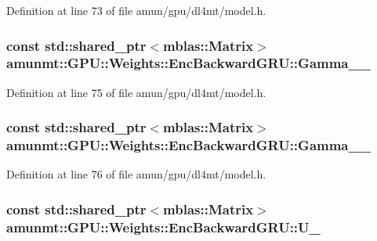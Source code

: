 Definition at line 73 of file amun/gpu/dl4mt/model.\+h.

\subsubsection[{\texorpdfstring{Gamma\+\_\+1\+\_\+}{Gamma_1_}}]{\setlength{\rightskip}{0pt plus 5cm}const std\+::shared\+\_\+ptr$<${\bf mblas\+::\+Matrix}$>$ amunmt\+::\+G\+P\+U\+::\+Weights\+::\+Enc\+Backward\+G\+R\+U\+::\+Gamma\+\_\+\_\+}\hypertarget{structamunmt_1_1GPU_1_1Weights_1_1EncBackwardGRU_a2c10a7a39209e10da9d93f915e5b890e}{}\label{structamunmt_1_1GPU_1_1Weights_1_1EncBackwardGRU_a2c10a7a39209e10da9d93f915e5b890e}


Definition at line 75 of file amun/gpu/dl4mt/model.\+h.

\subsubsection[{\texorpdfstring{Gamma\+\_\+2\+\_\+}{Gamma_2_}}]{\setlength{\rightskip}{0pt plus 5cm}const std\+::shared\+\_\+ptr$<${\bf mblas\+::\+Matrix}$>$ amunmt\+::\+G\+P\+U\+::\+Weights\+::\+Enc\+Backward\+G\+R\+U\+::\+Gamma\+\_\+\_\+}\hypertarget{structamunmt_1_1GPU_1_1Weights_1_1EncBackwardGRU_acbbe979c9f3efb14be4e607a3a8519dc}{}\label{structamunmt_1_1GPU_1_1Weights_1_1EncBackwardGRU_acbbe979c9f3efb14be4e607a3a8519dc}


Definition at line 76 of file amun/gpu/dl4mt/model.\+h.

\subsubsection[{\texorpdfstring{U\+\_\+}{U_}}]{\setlength{\rightskip}{0pt plus 5cm}const std\+::shared\+\_\+ptr$<${\bf mblas\+::\+Matrix}$>$ amunmt\+::\+G\+P\+U\+::\+Weights\+::\+Enc\+Backward\+G\+R\+U\+::\+U\+\_\+}\hypertarget{structamunmt_1_1GPU_1_1Weights_1_1EncBackwardGRU_ace653a590c3e2dd0522ffd08b251bff9}{}\label{structamunmt_1_1GPU_1_1Weights_1_1EncBackwardGRU_ace653a590c3e2dd0522ffd08b251bff9}


